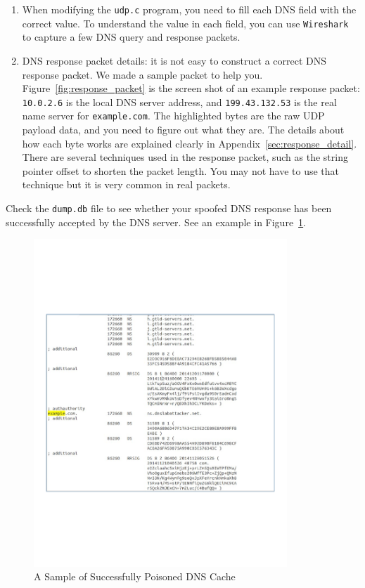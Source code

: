 \begin{enumerate}

\item When modifying the {\tt udp.c} program, you need to fill 
each DNS field with the correct value.  To understand the value in each
field, you can use {\tt Wireshark} to capture a few DNS query and response packets. 

\item DNS response packet details: it is not easy to construct a correct DNS
response packet. We made a sample packet to help you.
Figure~\ref{fig:response_packet} is the screen shot of an example response packet:
{\tt 10.0.2.6} is the local DNS server address, and 
{\tt 199.43.132.53} is the real name server for {\tt example.com}. 
The highlighted bytes are the raw UDP payload data, and you need to figure
out what they are.
The details about how each byte works are explained clearly in 
Appendix~\ref{sec:response_detail}.
There are several techniques used in the response packet, such as  
the string pointer offset to shorten the packet length. 
You may not have to use that technique but it is
very common in real packets.

\end{enumerate} 


Check the {\tt dump.db} file to see whether your spoofed DNS
response has been successfully accepted by the DNS server. 
See an example in Figure~\ref{fig:cache_screenshot}.

\begin{figure}[!htb]
\centering
\includegraphics*[viewport=0 180 600 630,width=0.85\textwidth,natwidth=621,natheight=403]{Figs/cache_screenshot.pdf}
\caption{A Sample of Successfully Poisoned DNS Cache}
\label{fig:cache_screenshot}
\end{figure}


